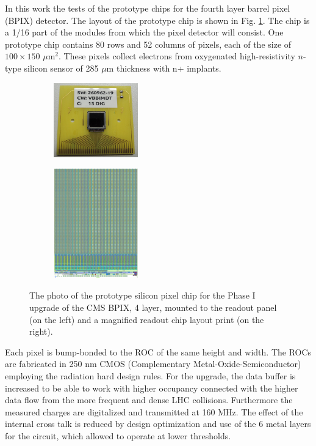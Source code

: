 In this work the tests of the prototype chips for the fourth layer barrel pixel (BPIX) detector. The layout of the prototype chip is shown 
in Fig. \ref{fig:prototype}. The chip is a 1/16 part of the modules from which the pixel detector will consist. 
One prototype chip contains 80 rows and 52 columns of pixels, each of the size of $100\times150$ $\mu$m$^{2}$.
These pixels collect electrons from oxygenated high-resistivity $n$-type silicon sensor of 285 $\mu$m thickness with n+ implants. 

\begin{figure}[t]
 \centering
 \begin{subfigure}
  \centering
  \includegraphics[width=0.4\textwidth]{021_pixel_upgrade/plots/prototype_chip_photo.png}
 \end{subfigure}
 \begin{subfigure}
  \centering
  \includegraphics[width=0.4\textwidth]{021_pixel_upgrade/plots/prototype_chip.png}
 \end{subfigure}
 \caption{The photo of the prototype silicon pixel chip for the Phase I upgrade of the CMS BPIX, 4 layer, mounted to the readout panel (on the left)
 and a magnified readout chip layout print (on the right).}
 \label{fig:prototype}
\end{figure}

Each pixel is bump-bonded to the ROC of the same height and width. The ROCs are fabricated in 250 nm CMOS (Complementary Metal-Oxide-Semiconductor)
employing the radiation hard design rules.
For the upgrade, the data buffer is increased to be able to work with higher occupancy connected with the higher data flow from the more frequent 
and dense LHC collisions. Furthermore the measured charges are digitalized and transmitted at 160 MHz. The effect of the internal cross talk is reduced
by design optimization and use of the 6 metal layers for the circuit, which allowed to operate at lower thresholds.


